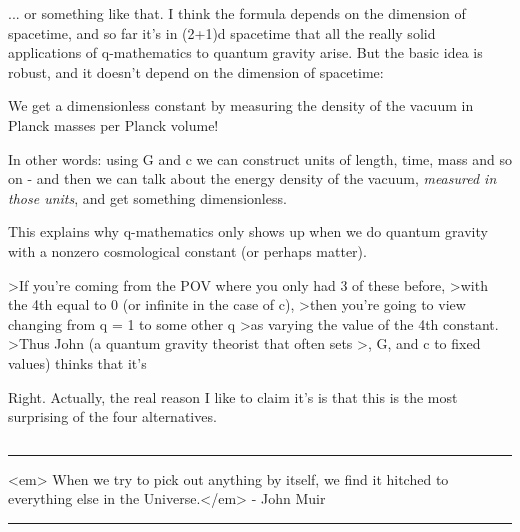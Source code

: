 ... or something like that.  I think the formula depends on 
the dimension of spacetime, and so far it's in (2+1)d spacetime
that all the really solid applications of q-mathematics to
quantum gravity arise.  But the basic idea is robust, and it
doesn't depend on the dimension of spacetime:

We get a dimensionless constant by measuring the density of
the vacuum in Planck masses per Planck volume!

In other words: using \hbar  G and c we can construct units of
length, time, mass and so on - and then we can talk about the
energy density of the vacuum, \emph{measured in those units}, and
get something dimensionless.

This explains why q-mathematics only shows up when we do 
quantum gravity with a nonzero cosmological constant (or perhaps
matter).

>If you're coming from the POV where you only had 3 of these before,
>with the 4th equal to 0 (or infinite in the case of c),
>then you're going to view changing from q = 1 to some other q
>as varying the value of the 4th constant.
>Thus John (a quantum gravity theorist that often sets
>\hbar , G, and c to fixed values) thinks that it's \Lambda  [...]

Right.  Actually, the real reason I like to claim it's \Lambda 
is that this is the most surprising of the four alternatives.

$$
    
\par\noindent\rule{\textwidth}{0.4pt}
<em> When we try to pick out anything by itself, we find it hitched 
to everything else in the Universe.</em> - John Muir

\par\noindent\rule{\textwidth}{0.4pt}

